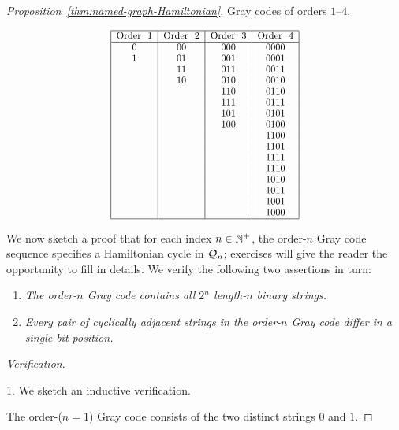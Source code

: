 \begin{proof}[Proposition~\ref{thm:named-graph-Hamiltonian}]
\begin{table}
\caption{Gray codes of orders $1$--$4$.}
\label{tab:gray-code}
\begin{equation}
 {\small
\begin{array}{|c|c|c|c|}
\hline
\mbox{Order } \ 1
  & \mbox{Order } \ 2
  & \mbox{Order } \ 3
  & \mbox{Order } \ 4 \\
\hline
0   & 00   & 000  &  0000 \\ 
1   & 01   & 001  &  0001 \\
    & 11   & 011  &  0011 \\
    & 10   & 010  &  0010 \\
    &      & 110  &  0110 \\
    &      & 111  &  0111 \\
    &      & 101  &  0101 \\
    &      & 100  &  0100 \\
    &      &      &  1100 \\  
    &      &      &  1101 \\  
    &      &      &  1111 \\  
    &      &      &  1110 \\  
    &      &      &  1010 \\  
    &      &      &  1011 \\  
    &      &      &  1001 \\  
    &      &      &  1000 \\  
\hline
\end{array} }
\end{equation}
\end{table}

We now sketch a proof that for each index $n \in \mathbb{N}^+$, the order-$n$ Gray code sequence specifies a Hamiltonian cycle in $\mbox{$\cal Q$}_n$; exercises will give the reader the opportunity to fill in details.  We verify the following two assertions in turn:
\begin{enumerate}
\item
{\it The order-$n$ Gray code contains all $2^n$ length-$n$ binary strings.}
\item
{\it Every pair of cyclically adjacent strings in the order-$n$ Gray code differ in a single bit-position.}
\end{enumerate}
{\it Verification}.

 1.
We sketch an inductive verification.

The order-($n=1$) Gray code consists of the two distinct strings $0$ and $1$.


\end{proof}
